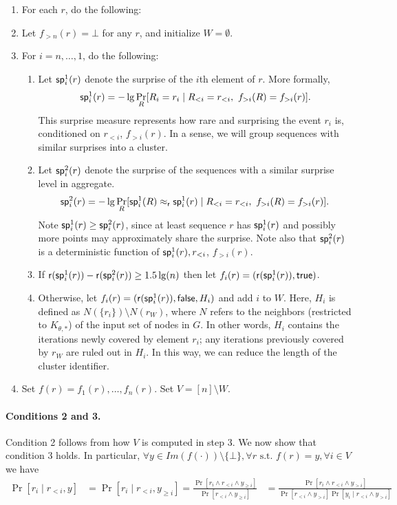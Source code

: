 \begin{enumerate}
\item[] \hspace{-2em} For each $r$, do the following:
\item Let $f_{>n}(r) = \bot$ for any $r$, and initialize $W = \emptyset$.
\item For $i = n,\dots,1$, do the following: 
\begin{enumerate}
\item 
Let $\mathsf{sp}^1_i(r)$ denote the surprise of the $i$th element of $r$. More formally, 
    \[\mathsf{sp}^1_i(r) = -\lg \Pr_{R}[R_i = r_i \mid R_{<i} = r_{<i}, ~f_{>i}(R) = f_{>i}(r)]. \]
    This surprise measure represents how rare and surprising the event $r_i$ is, conditioned on $r_{<i}$, $f_{>i}(r)$. In a sense, we will group sequences with similar surprises into a cluster. 

\item 
Let $\mathsf{sp}^2_i(r)$ denote the surprise of the sequences with a similar surprise level in aggregate.  
    \[\mathsf{sp}^2_i(r) = -\lg \Pr_{R}[\mathsf{sp}^1_i(R) \approx_{\mathsf{r}} \mathsf{sp}^1_i(r) 
     \mid R_{<i} = r_{<i}, ~f_{>i}(R) = f_{>i}(r)].\]
Note $\mathsf{sp}^1_i(r) \ge \mathsf{sp}^2_i(r)$, since at least sequence $r$ has $\mathsf{sp}^1_i(r)$ and possibly more points may approximately share the surprise.
Note also that $\mathsf{sp}^2_i(r)$ is a deterministic function of $\mathsf{sp}^1_i(r), r_{<i}$, $f_{>i}(r)$. 

\item If $\mathsf{r}(\mathsf{sp}^1_i(r)) - \mathsf{r}(\mathsf{sp}^2_i(r)) \geq 1.5\lg(n)$ then let $f_i(r) = (\mathsf{r}(\mathsf{sp}^1_i(r)), \mathsf{true})$.
%
\item 
Otherwise, let $f_i(r) = (\mathsf{r}(\mathsf{sp}^1_i(r)), \mathsf{false}, H_i)$ and 
add $i$ to $W$. 
%
Here, $H_i$ is defined as $N(\{r_i\})\setminus N(r_W)$, where  
$N$ refers to the neighbors (restricted to $K_{\theta,*}$) of the input set of nodes in $G$. In other words, $H_i$ contains the iterations newly covered by element $r_i$; any iterations previously covered by $r_W$ are ruled out in $H_i$. In this way, we can reduce the length of the cluster identifier.
\end{enumerate}

\item Set $f(r) = f_1(r),\dots,f_n(r)$. 
      Set $V = [n] \setminus W$.
\end{enumerate}

\paragraph{Conditions 2 and 3.}
Condition 2 follows from how $V$ is computed in step 3. We now show that condition 3 holds. In particular, 
$\forall y \in Im(f(\cdot)) \setminus \{\bot\}, \forall r \mbox{ s.t. } f(r) = y, \forall i \in V$ we have
\begin{align*}
\Pr[r_i \mid r_{<i}, y] & = \Pr[r_i \mid r_{<i}, y_{\geq i}] = \frac{\Pr[r_i \land r_{<i} \land y_{\geq i}]}{\Pr[r_{<i} \land y_{\geq i}]}
&= \frac{\Pr[r_i \land r_{<i} \land y_{> i} ]}{\Pr[r_{<i} \land y_{>i} ]\Pr[y_i \mid r_{<i} \land y_{>i} ]  } 
\end{align*} 


